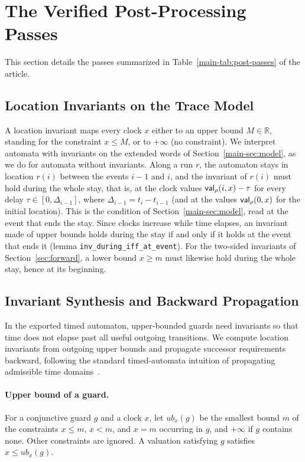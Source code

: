 \section{The Verified Post-Processing Passes}
\label{sec:supp-passes}
This section details the passes summarized in Table~\ref{main-tab:post-passes} of
the article.

\subsection{Location Invariants on the Trace Model}
\label{sec:inv-semantics}
A location invariant maps every clock $x$ either to an upper bound
$M\in\mathbb R$, standing for the constraint $x\le M$, or to $+\infty$ (no
constraint).  We interpret automata with invariants on the extended words of
Section~\ref{main-sec:model}, as we do for automata without invariants.
Along a run $r$, the automaton stays in location $r(i)$ between the events
$i-1$ and $i$, and the invariant of $r(i)$ must hold during the whole stay,
that is, at the clock values $\mathsf{val}_\rho(i,x)-\tau$ for every delay
$\tau\in[0,\Delta_{i-1}]$, where $\Delta_{i-1}=t_i-t_{i-1}$ (and at the values $\mathsf{val}_\rho(0,x)$ for the
initial location).  This is the condition of Section~\ref{main-sec:model}, read at
the event that ends the stay.  Since clocks increase while time elapses, an
invariant made of upper bounds holds during the stay if and only if it holds at
the event that ends it (lemma \texttt{inv\_\allowbreak{}during\_\allowbreak{}iff\_\allowbreak{}at\_\allowbreak{}event}).
For the two-sided invariants of Section~\ref{sec:forward}, a lower bound
$x\ge m$ must likewise hold during the whole stay, hence at its beginning.

\subsection{Invariant Synthesis and Backward Propagation}
\label{sec:uppaal-invariants}
In the exported timed automaton, upper-bounded guards need invariants so that
time does not elapse past all useful outgoing transitions.  We compute location
invariants from outgoing upper bounds and propagate successor requirements
backward, following the standard timed-automata intuition of propagating
admissible time domains~\cite{[BGD04]}.

\paragraph{Upper bound of a guard.}
For a conjunctive guard $g$ and a clock $x$, let $\mathit{ub}_x(g)$ be the
smallest bound $m$ of the constraints $x\le m$, $x<m$, and $x=m$ occurring in
$g$, and $+\infty$ if $g$ contains none.  Other constraints are ignored.  A
valuation satisfying $g$ satisfies $x\le\mathit{ub}_x(g)$.


